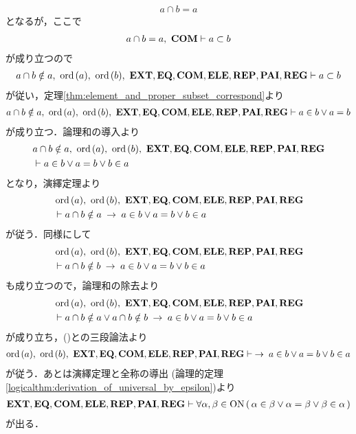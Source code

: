 \begin{sketch}
\begin{description}
\begin{align}
					a \cap b = a
				\end{align}
				となるが，ここで
				\begin{align}
					a \cap b = a,\ \mbox{\bf COM} \vdash a \subset b
				\end{align}
				が成り立つので
				\begin{align}
					a \cap b \notin a,\ \ord{a},\ \ord{b},\ \EXTAX,\EQAX,\COMAX,\ELEAX,\REPAX,\PAIAX,\REGAX \vdash 
					a \subset b
				\end{align}
				が従い，定理\ref{thm:element_and_proper_subset_correspond}より
				\begin{align}
					a \cap b \notin a,\ \ord{a},\ \ord{b},\ \EXTAX,\EQAX,\COMAX,\ELEAX,\REPAX,\PAIAX,\REGAX \vdash 
					a \in b \vee a = b
				\end{align}
				が成り立つ．論理和の導入より
				\begin{align}
					&a \cap b \notin a,\ \ord{a},\ \ord{b},\ \EXTAX,\EQAX,\COMAX,\ELEAX,\REPAX,\PAIAX,\REGAX \\
					&\vdash a \in b \vee a = b \vee b \in a
				\end{align}
				となり，演繹定理より
				\begin{align}
					&\ord{a},\ \ord{b},\ \EXTAX,\EQAX,\COMAX,\ELEAX,\REPAX,\PAIAX,\REGAX \\
					&\vdash a \cap b \notin a \rarrow a \in b \vee a = b \vee b \in a
				\end{align}
				が従う．同様にして
				\begin{align}
					&\ord{a},\ \ord{b},\ \EXTAX,\EQAX,\COMAX,\ELEAX,\REPAX,\PAIAX,\REGAX \\
					&\vdash a \cap b \notin b \rarrow a \in b \vee a = b \vee b \in a
				\end{align}
				も成り立つので，論理和の除去より
				\begin{align}
					&\ord{a},\ \ord{b},\ \EXTAX,\EQAX,\COMAX,\ELEAX,\REPAX,\PAIAX,\REGAX \\
					&\vdash 
					a \cap b \notin a \vee a \cap b \notin b
					\rarrow a \in b \vee a = b \vee b \in a
				\end{align}
				が成り立ち，()との三段論法より
				\begin{align}
					\ord{a},\ \ord{b},\ \EXTAX,\EQAX,\COMAX,\ELEAX,\REPAX,\PAIAX,\REGAX \vdash 
					\rarrow a \in b \vee a = b \vee b \in a
				\end{align}
				が従う．あとは演繹定理と全称の導出
				(論理的定理\ref{logicalthm:derivation_of_universal_by_epsilon})より
				\begin{align}
					\mbox{{\bf EXT}},\mbox{{\bf EQ}},\mbox{\bf COM},\mbox{{\bf ELE}},\mbox{{\bf REP}},\mbox{{\bf PAI}},\mbox{{\bf REG}} \vdash 
					\forall \alpha,\beta \in \mathrm{ON}\, (\, \alpha \in \beta \vee \alpha = \beta \vee \beta \in \alpha\, )
				\end{align}
				が出る．
				\QED
		\end{description}
	\end{sketch}
	

